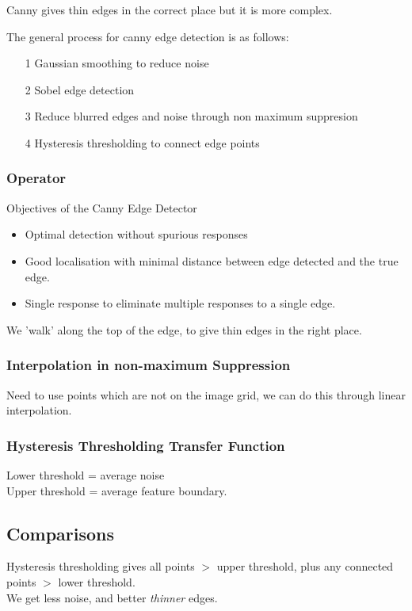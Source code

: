 Canny gives thin edges in the correct place but it is more complex.

The general process for canny edge detection is as follows:

\begin{itemize}
    \item [1] Gaussian smoothing to reduce noise
    \item [2] Sobel edge detection
    \item [3] Reduce blurred edges and noise through non maximum suppresion
    \item [4] Hysteresis thresholding to connect edge points
\end{itemize}

\subsubsection{Operator}
Objectives of the Canny Edge Detector
\begin{itemize}
    \itemsep0em 
    \item Optimal detection without spurious responses
    \item Good localisation with minimal distance between edge detected and the true edge.
    \item Single response to eliminate multiple responses to a single edge.
\end{itemize}

We 'walk' along the top of the edge, to give thin edges in the right place.

\subsubsection{Interpolation in non-maximum Suppression}
Need to use points which are not on the image grid, we can do this through linear interpolation.

\subsubsection{Hysteresis Thresholding Transfer Function}
Lower threshold = average noise \\
Upper threshold = average feature boundary.

\subsection{Comparisons}

Hysteresis thresholding gives all points $>$ upper threshold, plus any connected points $>$ lower threshold.
\\
We get less noise, and better \textit{thinner} edges.

